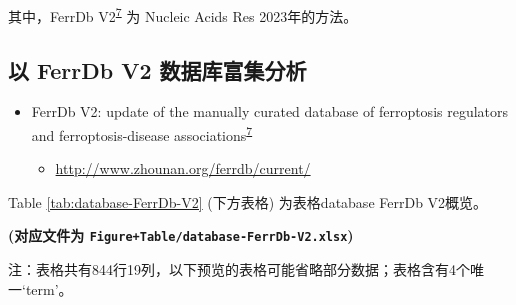 \documentclass[
]{article}
\providecommand{\tightlist}{%
  \setlength{\itemsep}{0pt}\setlength{\parskip}{0pt}}
\begin{document}
其中，FerrDb V2\textsuperscript{\protect\hyperlink{ref-FerrdbV2UpdaZhou2023}{7}} 为 Nucleic Acids Res 2023年的方法。

\hypertarget{ux4ee5-ferrdb-v2-ux6570ux636eux5e93ux5bccux96c6ux5206ux6790}{%
\subsection{以 FerrDb V2 数据库富集分析}\label{ux4ee5-ferrdb-v2-ux6570ux636eux5e93ux5bccux96c6ux5206ux6790}}

\begin{itemize}
\tightlist
\item
  FerrDb V2: update of the manually curated database of ferroptosis regulators
  and ferroptosis-disease associations\textsuperscript{\protect\hyperlink{ref-FerrdbV2UpdaZhou2023}{7}}

  \begin{itemize}
  \tightlist
  \item
    \url{http://www.zhounan.org/ferrdb/current/}
  \end{itemize}
\end{itemize}

Table \ref{tab:database-FerrDb-V2} (下方表格) 为表格database FerrDb V2概览。

\textbf{(对应文件为 \texttt{Figure+Table/database-FerrDb-V2.xlsx})}

\begin{center}\begin{tcolorbox}[colback=gray!10, colframe=gray!50, width=0.9\linewidth, arc=1mm, boxrule=0.5pt]注：表格共有844行19列，以下预览的表格可能省略部分数据；表格含有4个唯一`term'。
\end{tcolorbox}
\end{center}
\end{document}
